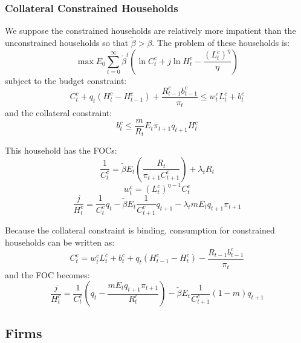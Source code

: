 \documentclass[11pt, a4paper]{article}
\begin{document}
\subsubsection{Collateral Constrained Households}

We suppose the constrained households are relatively more impatient than the unconstrained households so that $\tilde\beta > \beta$. The problem of these households is:
\begin{equation}
\max E_{0} \sum_{t=0}^{\infty} \widetilde{\beta}^{t}\left(\ln C_{t}^{c}+j \ln H_{t}^{c}-\frac{\left(L_{t}^{c}\right)^{\eta}}{\eta}\right)
\end{equation}
subject to the budget constraint:
\begin{equation}
C_{t}^{c}+q_{t}\left(H_{t}^{c}-H_{t-1}^{c}\right)+\frac{R_{t-1}^{c} b_{t-1}^{c}}{\pi_{t}} \leq w_{t}^{c} L_{t}^{c}+b_{t}^{c}
\end{equation}
and the collateral constraint:
\begin{equation}
b_{t}^{c} \leq \frac{m}{R_{t}} E_{t} \pi_{t+1} q_{t+1} H_{t}^{c}
\end{equation}

This household has the FOCs:
\begin{equation}
\frac{1}{C_{t}^{c}}=\widetilde{\beta} E_{t}\left(\frac{R_{t}}{\pi_{t+1} C_{t+1}^{c}}\right)+\lambda_{t} R_{t}
\end{equation}
\begin{equation}
w_{t}^{c}=\left(L_{t}^{c}\right)^{\eta-1} C_{t}^{c}
\end{equation}
\begin{equation}
\frac{j}{H_{t}^{c}}=\frac{1}{C_{t}^{c}} q_{t}-\widetilde{\beta} E_{t} \frac{1}{C_{t+1}^{c}} q_{t+1}-\lambda_{t} m E_{t} q_{t+1} \pi_{t+1}
\end{equation}

Because the collateral constraint is binding, consumption for constrained households can be written as:
\begin{equation}
C_{t}^{c}=w_{t}^{c} L_{t}^{c}+b_{t}^{c}+q_{t}\left(H_{t-1}^{c}-H_{t}^{c}\right)-\frac{R_{t-1} b_{t-1}^{c}}{\pi_{t}}
\end{equation}
and the FOC becomes:
\begin{equation}
\frac{j}{H_{t}^{c}}=\frac{1}{C_{t}^{c}}\left(q_{t}-\frac{m E_{t} q_{t+1} \pi_{t+1}}{R_{t}^{c}}\right)-\widetilde{\beta} E_{t} \frac{1}{C_{t+1}^{c}}(1-m) q_{t+1}
\end{equation}

\subsection{Firms}
\end{document}
